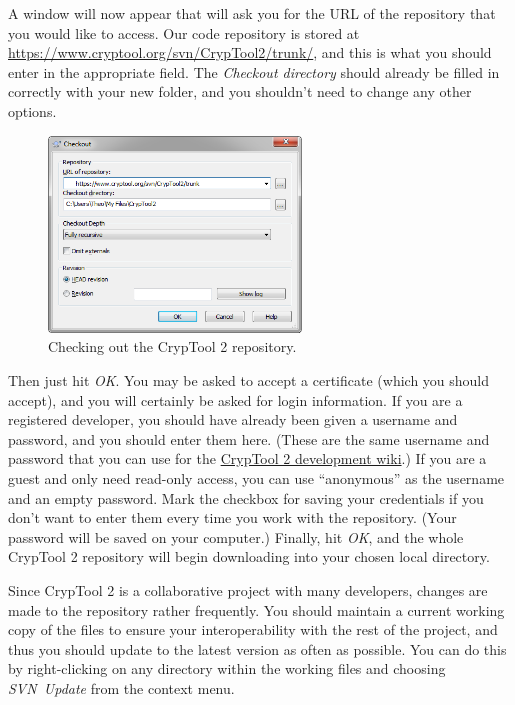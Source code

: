 A window will now appear that will ask you for the URL of the repository that you would like to access. Our code repository is stored at \url{https://www.cryptool.org/svn/CrypTool2/trunk/}, and this is what you should enter in the appropriate field. The \textit{Checkout directory} should already be filled in correctly with your new folder, and you shouldn't need to change any other options.

\begin{figure}[h!]
	\centering
		\includegraphics[width=0.60\textwidth]{figures/tortoise_svn_checkout_window.png}
	\caption{Checking out the CrypTool 2 repository.}
	\label{fig:tortoise_svn_checkout2}
\end{figure}

Then just hit \textit{OK}. You may be asked to accept a certificate (which you should accept), and you will certainly be asked for login information. If you are a registered developer, you should have already been given a username and password, and you should enter them here. (These are the same username and password that you can use for the \href{https://www.cryptool.org/trac/CrypTool2/wiki}{CrypTool 2 development wiki}.) If you are a guest and only need read-only access, you can use ``anonymous'' as the username and an empty password. Mark the checkbox for saving your credentials if you don't want to enter them every time you work with the repository. (Your password will be saved on your computer.) Finally, hit \textit{OK}, and the whole CrypTool 2 repository will begin downloading into your chosen local directory.

Since CrypTool 2 is a collaborative project with many developers, changes are made to the repository rather frequently. You should maintain a current working copy of the files to ensure your interoperability with the rest of the project, and thus you should update to the latest version as often as possible. You can do this by right-clicking on any directory within the working files and choosing \textit{SVN~Update} from the context menu.

